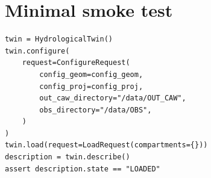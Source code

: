 \documentclass[11pt]{article}
\begin{document}
\section{Minimal smoke test}

\begin{verbatim}
twin = HydrologicalTwin()
twin.configure(
    request=ConfigureRequest(
        config_geom=config_geom,
        config_proj=config_proj,
        out_caw_directory="/data/OUT_CAW",
        obs_directory="/data/OBS",
    )
)
twin.load(request=LoadRequest(compartments={}))
description = twin.describe()
assert description.state == "LOADED"
\end{verbatim}
\end{document}
